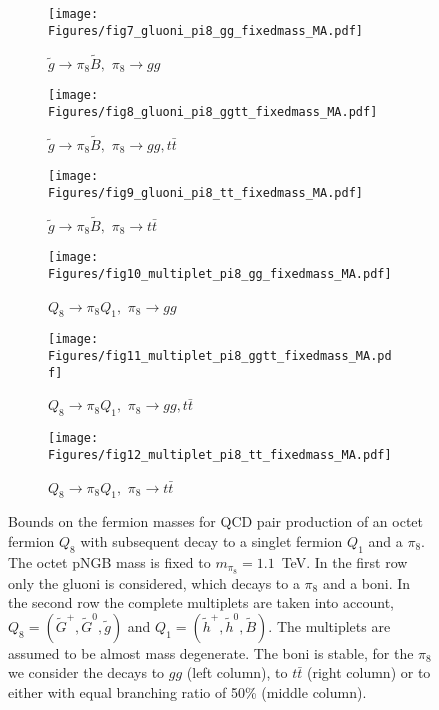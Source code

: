 \documentclass[preprintnumbers,nofootinbib,showpacs,eqsecnum,pre,12pt]{revtex4-1}
\begin{document}
\begin{figure}
		\centering
	\begin{subfigure}[]{0.31\linewidth}
		\centering
		\texttt{[image: Figures/fig7\_gluoni\_pi8\_gg\_fixedmass\_MA.pdf]} 
		\caption{$\tilde g\to \pi_8\tilde B,$ $\pi_8\to gg$}\label{fig:fig7_gluoni_pi8_gg_fixedmass_MA}
	\end{subfigure}
	\begin{subfigure}[]{0.31\linewidth}
		\centering
		\texttt{[image: Figures/fig8\_gluoni\_pi8\_ggtt\_fixedmass\_MA.pdf]} 
		\caption{$\tilde g\to \pi_8\tilde B,$ $\pi_8\to gg,t\bar t$}\label{fig:fig8_gluoni_pi8_ggtt_fixedmass_MA}
	\end{subfigure}
		\begin{subfigure}[]{0.31\linewidth}
		\centering
		\texttt{[image: Figures/fig9\_gluoni\_pi8\_tt\_fixedmass\_MA.pdf]} 
		\caption{$\tilde g\to \pi_8\tilde B,$ $\pi_8\to t \bar t$}\label{fig:fig9_gluoni_pi8_tt_fixedmass_MA}
	\end{subfigure}
	\vspace{1.5ex}
	
	\begin{subfigure}[]{0.31\linewidth}
		\centering
		\texttt{[image: Figures/fig10\_multiplet\_pi8\_gg\_fixedmass\_MA.pdf]} 
		\caption{$Q_8\to \pi_8 Q_1,$ $\pi_8\to gg$}\label{fig:fig10_multiplet_pi8_gg_fixedmass_MA}
	\end{subfigure}
	\begin{subfigure}[]{0.31\linewidth}
		\centering
		\texttt{[image: Figures/fig11\_multiplet\_pi8\_ggtt\_fixedmass\_MA.pdf]} 
		\caption{$Q_8\to \pi_8 Q_1,$ $\pi_8\to gg,t\bar t$}\label{fig:fig11_multiplet_pi8_ggtt_fixedmass_MA}
	\end{subfigure}
	\begin{subfigure}[]{0.31\linewidth}
		\centering
		\texttt{[image: Figures/fig12\_multiplet\_pi8\_tt\_fixedmass\_MA.pdf]} 
		\caption{$Q_8\to \pi_8 Q_1,$ $\pi_8\to t\bar t$}\label{fig:fig12_multiplet_pi8_tt_fixedmass_MA}
	\end{subfigure}
	\caption{Bounds on the fermion masses for QCD pair production of an octet fermion $Q_8$ with subsequent decay to a singlet fermion $Q_1$ and a $\pi_8$. The octet pNGB mass is fixed to $m_{\pi_8}=1.1$~TeV.
	In the first row only the gluoni is considered, which decays to a $\pi_8$ and a boni.
	In the second row the complete multiplets are taken into account, $Q_8=(\tilde G^+,\tilde G^0,\tilde g)$ and $Q_1=(\tilde h^+, \tilde h^0, \tilde B)$.
	The multiplets are assumed to be almost mass degenerate.
	The boni is stable, for the $\pi_8$ we consider the decays to $gg$ (left column), to $t\bar t$ (right column) or to either with equal branching ratio of 50\% (middle column).}
	\label{fig:bounds_sgluon}
\end{figure}
\end{document}
